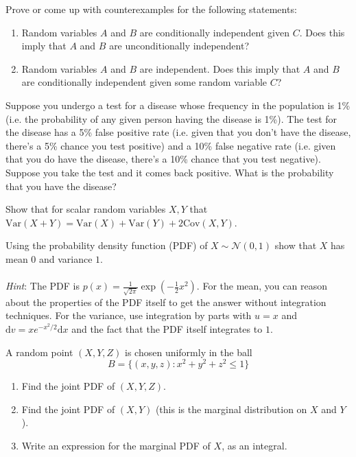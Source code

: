 \documentclass{harvardml}
\theoremstyle{definition}
\theoremstyle{plain}
\newcommand{\var}{\text{Var}}
\newcommand{\cov}{\text{Cov}}
\begin{document}
		    
\begin{problem}
    Prove or come up with counterexamples for the following statements:
    \begin{enumerate}[label=(\alph*)]
        \item  Random variables $A$ and $B$ are conditionally independent given $C$.  Does this imply that $A$ and $B$ are unconditionally independent?
        \item  Random variables $A$ and $B$ are independent.  Does this imply that $A$ and $B$ are conditionally independent given some random variable $C$?
    \end{enumerate}

\end{problem}
\begin{problem}
    Suppose you undergo a test for a disease whose frequency in the population is 1\% (i.e. the probability of any given person having the disease is 1\%). The test for the disease has a 5\% false positive rate (i.e. given that you don't have the disease, there's a 5\% chance you test positive) and a 10\% false negative rate (i.e. given that you do have the disease, there's a 10\% chance that you test negative). \\
    
    \noindent Suppose you take the test and it comes back positive. What is the probability that you have the disease? 
\end{problem}

\begin{problem}
    Show that for scalar random variables $X, Y$ that $\var(X+Y) = \var(X) + \var(Y) + 2\cov(X, Y)$.
    \end{problem}
    
\begin{problem}

Using the probability density function (PDF) of $X \sim \mathcal{N}(0, 1)$ show that $X$ has mean $0$ and variance $1$. \\
\\
\emph{Hint}: The PDF is $p(x) = \frac{1}{\sqrt{2\pi}} 
				\exp\left( -\frac{1}{2} x^2 \right).$ For the mean, you can reason about the properties of the PDF itself to get the answer without integration techniques. For the variance, use integration by parts with $u=x$ and $\mathrm{d}v = xe^{-x^2/2} \mathrm{d}x$ and the fact that the PDF itself integrates to $1$.
\end{problem}

\begin{problem}

A random point $(X, Y, Z)$ is chosen uniformly in the ball 
$$B = \{(x, y, z): x^2 + y^2 + z^2 \leq 1\}$$

\begin{enumerate} [label=(\alph*)] 
\item Find the joint PDF of $(X, Y, Z)$.
\item Find the joint PDF of  $(X, Y)$ (this is the marginal distribution on $X$ and $Y$).
\item Write an expression for the marginal PDF of $X$, as an integral.

\end{enumerate}
\end{problem}
\end{document}
